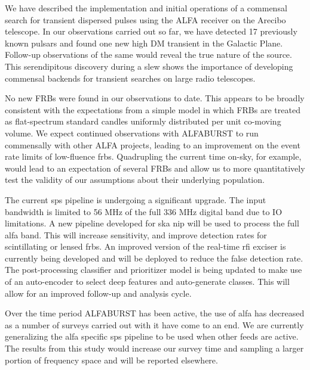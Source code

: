 \documentclass[a4paper,fleqn,usenatbib]{mnras}
\begin{document}
We have described the implementation and initial operations of a commensal
search for transient dispersed pulses using the ALFA receiver on the Arecibo
telescope. In our observations carried out so far, we have detected 17
previously known pulsars and found one new  high DM transient in the Galactic
Plane.  Follow-up observations of the same would reveal the true nature of the
source. This serendipitous discovery during a slew shows the importance of
developing commensal backends for transient searches on large radio telescopes.

No new FRBs were found in our observations to date. This appears to be broadly
consistent with the expectations from a simple model in which FRBs are treated
as flat-spectrum standard candles uniformly distributed per unit co-moving
volume. We expect continued observations with ALFABURST to run commensally with
other ALFA projects, leading to an improvement on the event rate limits of
low-fluence \glspl{frb}. Quadrupling the current time on-sky, for example,
would lead to an expectation of several FRBs and allow us to more
quantitatively test the validity of our assumptions about their underlying
population.

The current \gls{sps} pipeline is undergoing a significant upgrade. The input
bandwidth is limited to 56 MHz of the full 336 MHz digital band due to IO
limitations. A new pipeline developed for \gls{ska} \gls{nip} will be used to
process the full \gls{alfa} band.  This will increase sensitivity, and improve
detection rates for scintillating or lensed \glspl{frb}.  An improved version
of the real-time \gls{rfi} exciser is currently being developed and will be
deployed to reduce the false detection rate. The post-processing classifier and
prioritizer model is being updated to make use of an auto-encoder to select
deep features and auto-generate classes. This will allow for an improved
follow-up and analysis cycle.

Over the time period ALFABURST has been active, the use of \gls{alfa} has
decreased as a number of surveys carried out with it have come to an end. We
are currently generalizing the \gls{alfa} specific \gls{sps} pipeline to be
used when other feeds are active. The results from this study would increase
our survey time and sampling a larger portion of frequency space and will be
reported elsewhere. 


 

\bsp	%
\label{lastpage}
\end{document}
